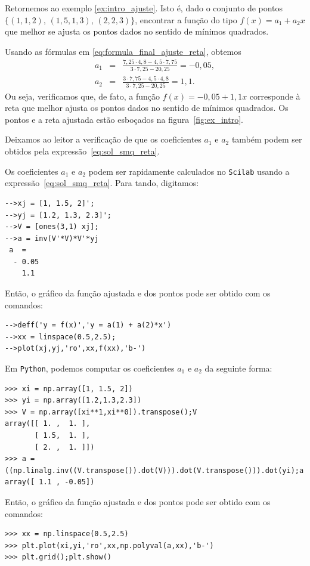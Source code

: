 \begin{ex}\label{ex:calculo_intro_ajuste}
  Retornemos ao exemplo \ref{ex:intro_ajuste}. Isto é, dado o conjunto de pontos $\{(1, 1,2)$, $(1,5, 1,3)$, $(2, 2,3)\}$, encontrar a função do tipo $f(x) = a_1 + a_2x$ que melhor se ajusta os pontos dados no sentido de mínimos quadrados.
\end{ex}
\begin{sol} Usando as fórmulas em \eqref{eq:formula_final_ajuste_reta}, obtemos
  \begin{eqnarray*}
    a_1&=&\frac{7,25 \cdot 4,8 - 4,5 \cdot 7,75  }{3\cdot 7,25 - 20,25 } = -0,05, \\
    a_2&=&\frac{3\cdot 7,75 - 4,5\cdot 4,8}{3\cdot 7,25 - 20,25}=1,1.
  \end{eqnarray*}
Ou seja, verificamos que, de fato, a função $f(x) = -0,05 + 1,1x$ corresponde à reta que melhor ajusta os pontos dados no sentido de mínimos quadrados. Os pontos e a reta ajustada estão esboçados na figura~\ref{fig:ex_intro}.

Deixamos ao leitor a verificação de que os coeficientes $a_1$ e $a_2$ também podem ser obtidos pela expressão~\eqref{eq:sol_smq_reta}.

\ifisscilab
Os coeficientes $a_1$ e $a_2$ podem ser rapidamente calculados no \verb+Scilab+ usando a expressão~\eqref{eq:sol_smq_reta}. Para tando, digitamos:
\begin{verbatim}
-->xj = [1, 1.5, 2]';  
-->yj = [1.2, 1.3, 2.3]'; 
-->V = [ones(3,1) xj]; 
-->a = inv(V'*V)*V'*yj 
 a  =
  - 0.05  
    1.1   
\end{verbatim}
Então, o gráfico da função ajustada e dos pontos pode ser obtido com os comandos:
\begin{verbatim}
-->deff('y = f(x)','y = a(1) + a(2)*x')
-->xx = linspace(0.5,2.5); 
-->plot(xj,yj,'ro',xx,f(xx),'b-')
\end{verbatim}
\fi
\ifispython
Em \verb+Python+, podemos computar os coeficientes $a_1$ e $a_2$ da seguinte forma:
\begin{verbatim}
>>> xi = np.array([1, 1.5, 2])
>>> yi = np.array([1.2,1.3,2.3])
>>> V = np.array([xi**1,xi**0]).transpose();V
array([[ 1. ,  1. ],
       [ 1.5,  1. ],
       [ 2. ,  1. ]])
>>> a = ((np.linalg.inv((V.transpose()).dot(V))).dot(V.transpose())).dot(yi);a
array([ 1.1 , -0.05])
\end{verbatim}
Então, o gráfico da função ajustada e dos pontos pode ser obtido com os comandos:
\begin{verbatim}
>>> xx = np.linspace(0.5,2.5)
>>> plt.plot(xi,yi,'ro',xx,np.polyval(a,xx),'b-')
>>> plt.grid();plt.show()
\end{verbatim}
\fi

\end{sol}

